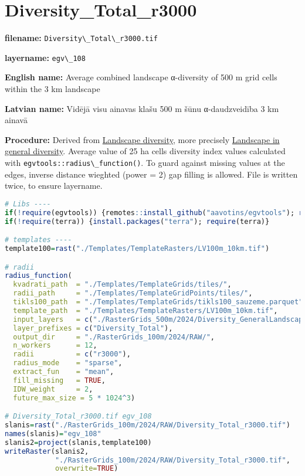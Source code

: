 \documentclass[
]{book}
\newcommand{\passthrough}[1]{#1}
\begin{document}
\section{Diversity\_Total\_r3000}\label{ch06.108}

\textbf{filename:} \passthrough{\lstinline!Diversity\_Total\_r3000.tif!}

\textbf{layername:} \passthrough{\lstinline!egv\_108!}

\textbf{English name:} Average combined landscape α-diversity of 500 m grid cells within the 3 km landscape

\textbf{Latvian name:} Vidējā visu ainavas klašu 500 m šūnu α-daudzveidība 3 km ainavā

\textbf{Procedure:} Derived from \hyperref[Ch05.04]{Landscape diversity}, more precisely
\hyperref[Ch05.04.01]{Landscape in general diversity}. Average value of 25 ha
cells diversity index values calculated with \passthrough{\lstinline!egvtools::radius\_function()!}. To
guard against missing values at the edges, inverse distance wieghted (power = 2)
gap filling is allowed. File is written twice, to ensure layername.

\begin{lstlisting}[language=R]
# Libs ----
if(!require(egvtools)) {remotes::install_github("aavotins/egvtools"); require(egvtools)}
if(!require(terra)) {install.packages("terra"); require(terra)}

# templates ----
template100=rast("./Templates/TemplateRasters/LV100m_10km.tif")

# radii
radius_function(
  kvadrati_path  = "./Templates/TemplateGrids/tiles/",
  radii_path     = "./Templates/TemplateGridPoints/tiles/",
  tikls100_path  = "./Templates/TemplateGrids/tikls100_sauzeme.parquet",
  template_path  = "./Templates/TemplateRasters/LV100m_10km.tif",
  input_layers   = c("./RasterGrids_500m/2024/Diversity_GeneralLandscape_500x.tif"),
  layer_prefixes = c("Diversity_Total"),
  output_dir     = "./RasterGrids_100m/2024/RAW/",
  n_workers      = 12,
  radii          = c("r3000"),
  radius_mode    = "sparse",
  extract_fun    = "mean",
  fill_missing   = TRUE,
  IDW_weight     = 2,
  future_max_size = 5 * 1024^3)

# Diversity_Total_r3000.tif egv_108
slanis=rast("./RasterGrids_100m/2024/RAW/Diversity_Total_r3000.tif")
names(slanis)="egv_108"
slanis2=project(slanis,template100)
writeRaster(slanis2,
            "./RasterGrids_100m/2024/RAW/Diversity_Total_r3000.tif",
            overwrite=TRUE)
\end{lstlisting}
\end{document}
